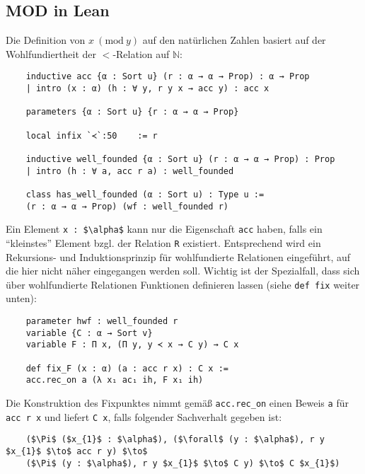 \documentclass[a4paper,12pt]{scrartcl}
\newcommand{\N}{\mathbb N}
\newcommand{\Mod}[1]{\ (\mathrm{mod}\ #1)}
\begin{document}
	\subsection{MOD in Lean}
	Die Definition von $x\Mod{y}$ auf den natürlichen Zahlen basiert auf der Wohlfundiertheit der $<$-Relation auf $\N$: 
	\begin{lstlisting}
	inductive acc {α : Sort u} (r : α → α → Prop) : α → Prop
	| intro (x : α) (h : ∀ y, r y x → acc y) : acc x
	
	parameters {α : Sort u} {r : α → α → Prop}
	
	local infix `≺`:50    := r
	
	inductive well_founded {α : Sort u} (r : α → α → Prop) : Prop
	| intro (h : ∀ a, acc r a) : well_founded
	
	class has_well_founded (α : Sort u) : Type u :=
	(r : α → α → Prop) (wf : well_founded r)
	\end{lstlisting}
	Ein Element \lstinline|x : $\alpha$| kann nur die Eigenschaft \lstinline|acc| haben, falls ein \enquote{kleinstes} Element bzgl. der Relation \lstinline|R| existiert. Entsprechend wird ein Rekursions- und Induktionsprinzip für wohlfundierte Relationen eingeführt, auf die hier nicht näher eingegangen werden soll. Wichtig ist der Spezialfall, dass sich über wohlfundierte Relationen Funktionen definieren lassen (siehe \lstinline|def fix| weiter unten):
	\begin{lstlisting}
	parameter hwf : well_founded r
	variable {C : α → Sort v}
	variable F : Π x, (Π y, y ≺ x → C y) → C x
	
	def fix_F (x : α) (a : acc r x) : C x :=
	acc.rec_on a (λ x₁ ac₁ ih, F x₁ ih)
	\end{lstlisting}
	Die Konstruktion des Fixpunktes nimmt gemäß \lstinline|acc.rec_on| einen Beweis \lstinline|a| für \lstinline|acc r x| und liefert \lstinline|C x|, falls folgender Sachverhalt gegeben ist:
	\begin{lstlisting}
	($\Pi$ ($x_{1}$ : $\alpha$), ($\forall$ (y : $\alpha$), r y $x_{1}$ $\to$ acc r y) $\to$ 
	($\Pi$ (y : $\alpha$), r y $x_{1}$ $\to$ C y) $\to$ C $x_{1}$)
	\end{lstlisting}
\end{document}
